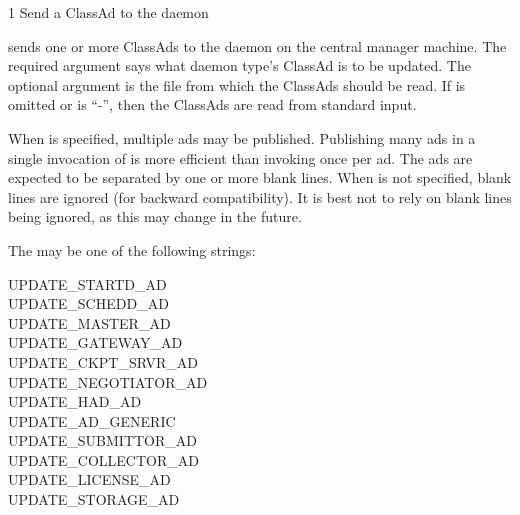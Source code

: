 \begin{ManPage}{\label{man-condor-advertise}}{1}
{Send a ClassAd to the  daemon}
\Synopsis {}
\ToolArgsBase
{}


\Description
{} sends one or more ClassAds to the  daemon on
the central manager machine.
The required argument  says what daemon type's ClassAd
is to be updated.
The optional argument  is the file from which the
ClassAds should be read.
If  is omitted or is ``-'', then the
ClassAds are read from standard input.

When  is specified, multiple ads may be published.
Publishing many ads in a single invocation of  is
more efficient than invoking  once per ad.  The ads
are expected to be separated by one or more blank lines.  When
 is not specified, blank lines are ignored (for
backward compatibility).  It is best not to rely on blank lines being
ignored, as this may change in the future.

The  may be one of the following strings:
\begin{description}
\item[UPDATE\_STARTD\_AD]
\item[UPDATE\_SCHEDD\_AD]
\item[UPDATE\_MASTER\_AD]
\item[UPDATE\_GATEWAY\_AD]
\item[UPDATE\_CKPT\_SRVR\_AD]
\item[UPDATE\_NEGOTIATOR\_AD]
\item[UPDATE\_HAD\_AD]
\item[UPDATE\_AD\_GENERIC]
\item[UPDATE\_SUBMITTOR\_AD]
\item[UPDATE\_COLLECTOR\_AD]
\item[UPDATE\_LICENSE\_AD]
\item[UPDATE\_STORAGE\_AD]
\end{description}


\end{ManPage}

